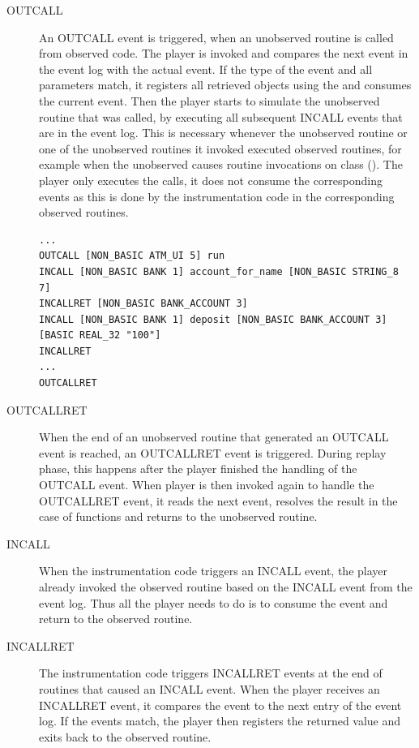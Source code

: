 \begin{description}
\item[OUTCALL] An OUTCALL event is triggered, when an unobserved routine is called from observed code. The player is invoked and compares the next event in the event log with the actual event. If the type of the event and all parameters match, it registers all retrieved objects using the  and consumes the current event. Then the player starts to simulate the unobserved routine that was called, by executing all subsequent INCALL events that are in the event log. This is necessary whenever the unobserved routine or one of the unobserved routines it invoked executed observed routines, for example when the unobserved  causes routine invocations on class  ().  The player only executes the calls, it does not consume the corresponding events as this is done by the instrumentation code in the corresponding observed routines.
\begin{lstlisting}[caption=Example Event Log that Requires Simulation of the Unobserved Routine,label=lst:eventlog_unobserved_simulation]
...
OUTCALL [NON_BASIC ATM_UI 5] run
INCALL [NON_BASIC BANK 1] account_for_name [NON_BASIC STRING_8 7]
INCALLRET [NON_BASIC BANK_ACCOUNT 3]
INCALL [NON_BASIC BANK 1] deposit [NON_BASIC BANK_ACCOUNT 3] [BASIC REAL_32 "100"]
INCALLRET
...
OUTCALLRET
\end{lstlisting}
\item[OUTCALLRET] When the end of an unobserved routine that generated an OUTCALL event is reached, an OUTCALLRET event is triggered. During replay phase, this happens after the player finished the handling of the OUTCALL event. When player is then invoked again to handle the OUTCALLRET event, it reads the next event, resolves the result in the case of functions and returns to the unobserved routine.
\item[INCALL] When the instrumentation code triggers an INCALL event, the player already invoked the observed routine based on the INCALL event from the event log. Thus all the player needs to do is to consume the event and return to the observed routine.
\item[INCALLRET] The instrumentation code triggers INCALLRET events at the end of routines that caused an INCALL event. When the player receives an INCALLRET event, it compares the event to the next entry of the event log. If the events match, the player then registers the returned value and exits back to the observed routine.
\end{description}


